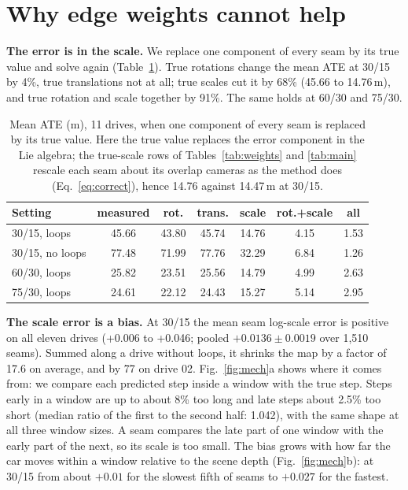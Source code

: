 \documentclass[conference]{IEEEtran}
\begin{document}
\section{Why edge weights cannot help}
\label{sec:why}

\textbf{The error is in the scale.} We replace one component of every seam by its true value and solve again
(Table~\ref{tab:oracle}). True rotations change the mean ATE at 30/15 by 4\%, true translations not at all; true scales
cut it by 68\% (45.66 to 14.76\,m), and true rotation and scale together by 91\%. The same holds at 60/30 and 75/30.

\begin{table}[t]
\centering
\caption{Mean ATE (m), 11 drives, when one component of every seam is replaced by its true value. Here the true
value replaces the error component in the Lie algebra; the true-scale rows of Tables~\ref{tab:weights} and
\ref{tab:main} rescale each seam about its overlap cameras as the method does (Eq.~\ref{eq:correct}), hence 14.76
against 14.47\,m at 30/15.}
\label{tab:oracle}
\footnotesize
\begin{tabular}{lcccccc}
\toprule
Setting & measured & rot. & trans. & scale & rot.+scale & all \\
\midrule
30/15, loops & 45.66 & 43.80 & 45.74 & 14.76 & 4.15 & 1.53 \\
30/15, no loops & 77.48 & 71.99 & 77.76 & 32.29 & 6.84 & 1.26 \\
60/30, loops & 25.82 & 23.51 & 25.56 & 14.79 & 4.99 & 2.63 \\
75/30, loops & 24.61 & 22.12 & 24.43 & 15.27 & 5.14 & 2.95 \\
\bottomrule
\end{tabular}
\end{table}

\textbf{The scale error is a bias.} At 30/15 the mean seam log-scale error is positive on all eleven drives (+0.006 to
+0.046; pooled $+0.0136\pm0.0019$ over 1{,}510 seams). Summed along a drive without loops, it shrinks the map by a
factor of 17.6 on average, and by 77 on drive 02. Fig.~\ref{fig:mech}a shows where it comes from: we compare each
predicted step inside a window with the true step. Steps early in a window are up to about 8\% too long and late steps about
2.5\% too short (median ratio of the first to the second half: 1.042), with the same shape at all three window sizes. A seam
compares the late part of one window with the early part of the next, so its scale is too small. The bias grows with
how far the car moves within a window relative to the scene depth (Fig.~\ref{fig:mech}b): at 30/15 from about $+0.01$
for the slowest fifth of seams to $+0.027$ for the fastest.
\end{document}
